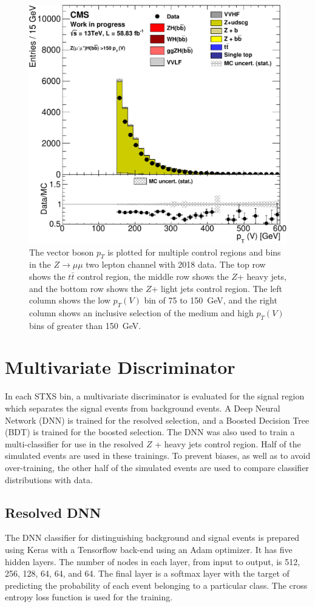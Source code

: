 \begin{figure}
  \includegraphics[width=0.42\linewidth]{figures/2018_Zmm/Zlf_medhigh_Zmm__Vpt_.pdf}
  \caption[Control region plots for two muons in 2018]{
    The vector boson $p_T$ is plotted for multiple control regions and bins in
    the $Z\rightarrow \mu\mu$ two lepton channel with 2018 data.
    The top row shows the $t\bar{t}$ control region,
    the middle row shows the $Z$+ heavy jets,
    and the bottom row shows the $Z$+ light jets control region.
    The left column shows the low $p_T(V)$ bin of 75 to \SI{150}{GeV},
    and the right column shows an inclusive selection of
    the medium and high $p_T(V)$ bins of greater than \SI{150}{GeV}.
  }
  \label{fig:2018_Zmm_vpt}
\end{figure}

\section{Multivariate Discriminator}

In each STXS bin, a multivariate discriminator is evaluated for the signal region which separates
the signal events from background events.
A Deep Neural Network (DNN) is trained for the resolved selection,
and a Boosted Decision Tree (BDT) is trained for the boosted selection.
The DNN was also used to train a multi-classifier for use in the resolved $Z$ + heavy jets control region.
Half of the simulated events are used in these trainings.
To prevent biases, as well as to avoid over-training, the other half of the simulated events are used
to compare classifier distributions with data.

\subsection{Resolved DNN}

The DNN classifier for distinguishing background and signal events is prepared using
Keras with a Tensorflow back-end using an Adam optimizer.
It has five hidden layers.
The number of nodes in each layer, from input to output, is 512, 256, 128, 64, 64, and 64.
The final layer is a softmax layer with the target of predicting the probability
of each event belonging to a particular class.
The cross entropy loss function is used for the training.

